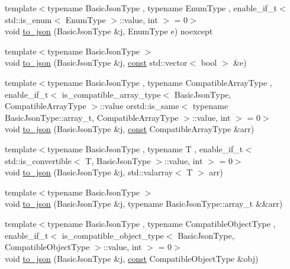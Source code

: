 \begin{DoxyCompactItemize}
\item 
{\footnotesize template$<$typename Basic\+Json\+Type , typename Enum\+Type , enable\+\_\+if\+\_\+t$<$ std\+::is\+\_\+enum$<$ Enum\+Type $>$\+::value, int $>$  = 0$>$ }\\void \hyperlink{namespacenlohmann_1_1detail_a0c8b159dba71981d6c555d284cf6e2bf}{to\+\_\+json} (Basic\+Json\+Type \&j, Enum\+Type e) noexcept
\item 
{\footnotesize template$<$typename Basic\+Json\+Type $>$ }\\void \hyperlink{namespacenlohmann_1_1detail_aeca6fb5fede5ed1e12a4420d98a5692b}{to\+\_\+json} (Basic\+Json\+Type \&j, \hyperlink{functions__c_8js_afacfd9c985d225bb07483b887a801b6f}{const} std\+::vector$<$ bool $>$ \&e)
\item 
{\footnotesize template$<$typename Basic\+Json\+Type , typename Compatible\+Array\+Type , enable\+\_\+if\+\_\+t$<$ is\+\_\+compatible\+\_\+array\+\_\+type$<$ Basic\+Json\+Type, Compatible\+Array\+Type $>$\+::value orstd\+::is\+\_\+same$<$ typename Basic\+Json\+Type\+::array\+\_\+t, Compatible\+Array\+Type $>$\+::value, int $>$  = 0$>$ }\\void \hyperlink{namespacenlohmann_1_1detail_a3afebc132c5ff83f9cd160e52030fdfd}{to\+\_\+json} (Basic\+Json\+Type \&j, \hyperlink{functions__c_8js_afacfd9c985d225bb07483b887a801b6f}{const} Compatible\+Array\+Type \&arr)
\item 
{\footnotesize template$<$typename Basic\+Json\+Type , typename T , enable\+\_\+if\+\_\+t$<$ std\+::is\+\_\+convertible$<$ T, Basic\+Json\+Type $>$\+::value, int $>$  = 0$>$ }\\void \hyperlink{namespacenlohmann_1_1detail_afd18898316e9a20a6458877d2ee27d31}{to\+\_\+json} (Basic\+Json\+Type \&j, std\+::valarray$<$ T $>$ arr)
\item 
{\footnotesize template$<$typename Basic\+Json\+Type $>$ }\\void \hyperlink{namespacenlohmann_1_1detail_aa0fd1b5788e9ba37e31da43dda738cb5}{to\+\_\+json} (Basic\+Json\+Type \&j, typename Basic\+Json\+Type\+::array\+\_\+t \&\&arr)
\item 
{\footnotesize template$<$typename Basic\+Json\+Type , typename Compatible\+Object\+Type , enable\+\_\+if\+\_\+t$<$ is\+\_\+compatible\+\_\+object\+\_\+type$<$ Basic\+Json\+Type, Compatible\+Object\+Type $>$\+::value, int $>$  = 0$>$ }\\void \hyperlink{namespacenlohmann_1_1detail_a24c9c12f3839c94e09532f08de85e949}{to\+\_\+json} (Basic\+Json\+Type \&j, \hyperlink{functions__c_8js_afacfd9c985d225bb07483b887a801b6f}{const} Compatible\+Object\+Type \&obj)

\end{DoxyCompactItemize}
